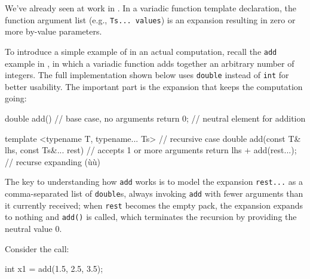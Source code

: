 We've already seen  at work in . In a variadic function template
declaration, the function argument list (e.g.,
\lstinline!Ts...!~\lstinline!values!) is an expansion resulting in zero or
more by-value parameters.

To introduce a simple example of  in an actual
computation, recall the \lstinline!add! example in
, in which a variadic function adds
together an arbitrary number of integers. The full implementation shown
below uses \lstinline!double! instead of \lstinline!int! for better usability.
The important part is the expansion that keeps the computation going:

\begin{emcppslisting}[emcppsbatch=e25]
double add()                                 // base case, no arguments
{
    return 0;                                // neutral element for addition
}

template <typename T, typename... Ts>        // recursive case
double add(const T& lhs, const Ts&... rest)  // accepts 1 or more arguments
{
    return lhs + add(rest...);               // recurse expanding (ù{}ù)
}
\end{emcppslisting}
    

\noindent The key to understanding how \lstinline!add! works is to model the
expansion \lstinline!rest...! as a comma-separated list of
\lstinline!double!s, always invoking \lstinline!add! with fewer arguments than
it currently received; when \lstinline!rest! becomes the empty pack, the
expansion expands to nothing and \lstinline!add()! is called, which
terminates the recursion by providing the neutral value 0.

Consider the call:

\begin{emcppslisting}[emcppsbatch=e25]
int x1 = add(1.5, 2.5, 3.5);
\end{emcppslisting}
    

